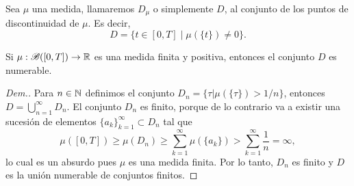 \begin{defi}
	Sea $\mu$ una medida, llamaremos $D_{\mu}$ o simplemente $D$, al conjunto de los puntos de discontinuidad  de $\mu$. Es decir, 
	$$D=\{t \in [0,T]  \mid  \mu(\{t\})\neq 0\}.$$
\end{defi}

\begin{lem}\label{D numerable}
	Si $\mu:\mathscr{B}([0,T])\to \mathbb{R}$ es una medida finita y positiva, entonces el conjunto $D$ es numerable.
\end{lem}
\begin{proof}[Dem.]
	Para $n\in\mathbb{N}$ definimos el conjunto $D_n=\{\tau|\mu(\{\tau\})>1/n\}$, entonces $D=\bigcup_{n=1}^\infty D_n$. El conjunto $D_n$ es finito, porque de lo contrario va a existir una sucesión de elementos $\{a_k\}_{k=1}^\infty\subset D_n$ tal que 
	\begin{equation*}
		\mu([0,T])\geq\mu(D_n)\geq\sum_{k=1}^{\infty}\mu(\{a_k\})>\sum_{k=1}^{\infty}\dfrac{1}{n}=\infty,
	\end{equation*}
	lo cual es un absurdo pues $\mu$ es una medida finita. Por lo tanto, $D_n$ es finito y $D$ es la unión numerable de conjuntos finitos. 
\end{proof}
